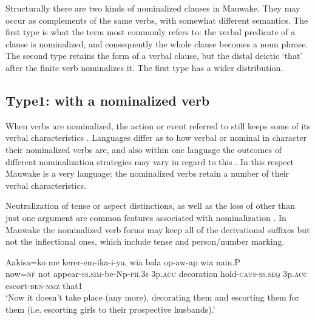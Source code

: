 Structurally there are two kinds of nominalized clauses in Mauwake. They may occur as complements of the same verbs, with somewhat different semantics. The first type is what the term  most commonly refers to: the verbal predicate of a clause is nominalized, and consequently the whole clause becomes a noun phrase. The second type retains the form of a verbal clause, but the distal deictic  `that' after the finite verb nominalizes it.  The first type has a wider distribution.

\subsection{Type1: with a nominalized verb} \label{sec:5.7.1}

When verbs are nominalized, the action or event referred to still keeps some of its verbal characteristics \citep[177]{HopperEtAl1985}. Languages differ as to how verbal or nominal in character their nominalized verbs are, and also within one language the outcomes of different nominalization strategies may vary in regard to this \citep[344]{ComrieEtAl2007}%
. In this respect Mauwake is a very  language: the nominalized verbs retain a number of their verbal characteristics.

Neutralization of tense or aspect distinctions, as well as the loss of other than just one argument are common features associated with nominalization \citep[737--738]{HopperEtAl1984}. In Mauwake the nominalized verb forms may keep all of the derivational suffixes but not the inflectional ones, which include tense and person/number marking.

\ea%
\label{ex:5:x1226}
\gll Aakisa=ko  me  kerer-em-ika-i-ya,  wia  bala op-aw-ap  wia    nain.P{\footnotemark} \\
     now=\textsc{nf}  not  appear-\textsc{ss}.\textsc{sim}-be-Np-\textsc{pr}.3s  3p.\textsc{acc}  decoration hold-\textsc{caus}-\textsc{ss}.\textsc{seq}  3p.\textsc{acc}  escort-\textsc{ben}-\textsc{nmz}  that1 \\
\glt `Now it doesn't take place (any more), decorating them and escorting them for them (i.e. escorting girls to their prospective husbands).'
\z
{}

